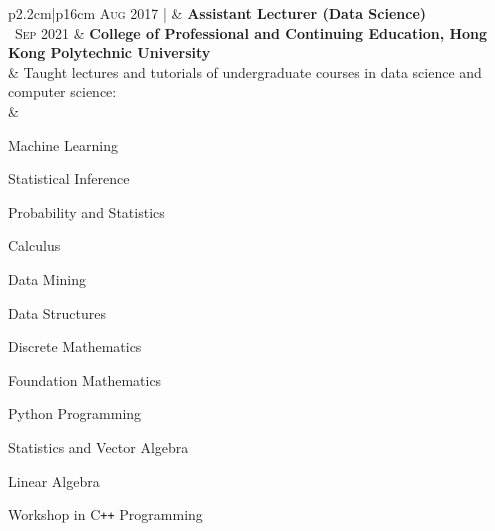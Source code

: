 \documentclass[10pt, oneside]{article}
\begin{document}
\begin{tabularx}{\linewidth}{p{2.2cm}|p{16cm}}
	\textsc{Aug} 2017 | & \textbf{Assistant Lecturer (Data Science)}\\
	\textsc{~Sep} 2021 & \textbf{College of Professional and Continuing Education, Hong Kong Polytechnic University}\\
	& Taught lectures and tutorials of undergraduate courses in data science and computer science:\\
	&	\begin{itemize}
		\vspace{0.2cm}
			\begin{minipage}{0.3\linewidth}
				\item Machine Learning
				\item Statistical Inference
				\item Probability and Statistics
				\item Calculus
			\end{minipage}
			\begin{minipage}{0.3\linewidth}
				\item Data Mining
				\item Data Structures
				\item Discrete Mathematics
				\item Foundation Mathematics
			\end{minipage}
			\begin{minipage}{0.4\linewidth}
				\item Python Programming 
				\item Statistics and Vector Algebra
				\item Linear Algebra
				\item Workshop in C\texttt{++} Programming
			\end{minipage}
		\end{itemize}


\end{tabularx}
\end{document}
